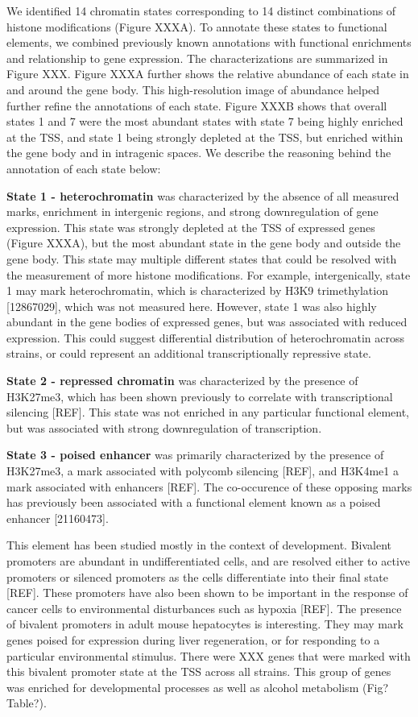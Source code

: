 \documentclass[10pt,letterpaper]{article}
\begin{document}
We identified 14 chromatin states corresponding to 14 distinct
combinations of histone modifications (Figure XXXA). To annotate these
states to functional elements, we combined previously known annotations
with functional enrichments and relationship to gene expression. The
characterizations are summarized in Figure XXX. Figure XXXA further
shows the relative abundance of each state in and around the gene body.
This high-resolution image of abundance helped further refine the
annotations of each state. Figure XXXB shows that overall states 1 and 7
were the most abundant states with state 7 being highly enriched at the
TSS, and state 1 being strongly depleted at the TSS, but enriched within
the gene body and in intragenic spaces. We describe the reasoning behind
the annotation of each state below:

\textbf{State 1 - heterochromatin} was characterized by the absence of
all measured marks, enrichment in intergenic regions, and strong
downregulation of gene expression. This state was strongly depleted at
the TSS of expressed genes (Figure XXXA), but the most abundant state in
the gene body and outside the gene body. This state may multiple
different states that could be resolved with the measurement of more
histone modifications. For example, intergenically, state 1 may mark
heterochromatin, which is characterized by H3K9 trimethylation
{[}12867029{]}, which was not measured here. However, state 1 was also
highly abundant in the gene bodies of expressed genes, but was
associated with reduced expression. This could suggest differential
distribution of heterochromatin across strains, or could represent an
additional transcriptionally repressive state.

\textbf{State 2 - repressed chromatin} was characterized by the presence
of H3K27me3, which has been shown previously to correlate with
transcriptional silencing {[}REF{]}. This state was not enriched in any
particular functional element, but was associated with strong
downregulation of transcription.

\textbf{State 3 - poised enhancer} was primarily characterized by the
presence of H3K27me3, a mark associated with polycomb silencing
{[}REF{]}, and H3K4me1 a mark associated with enhancers {[}REF{]}. The
co-occurence of these opposing marks has previously been associated with
a functional element known as a poised enhancer {[}21160473{]}.

This element has been studied mostly in the context of development.
Bivalent promoters are abundant in undifferentiated cells, and are
resolved either to active promoters or silenced promoters as the cells
differentiate into their final state {[}REF{]}. These promoters have
also been shown to be important in the response of cancer cells to
environmental disturbances such as hypoxia {[}REF{]}. The presence of
bivalent promoters in adult mouse hepatocytes is interesting. They may
mark genes poised for expression during liver regeneration, or for
responding to a particular environmental stimulus. There were XXX genes
that were marked with this bivalent promoter state at the TSS across all
strains. This group of genes was enriched for developmental processes as
well as alcohol metabolism (Fig? Table?).
\end{document}
